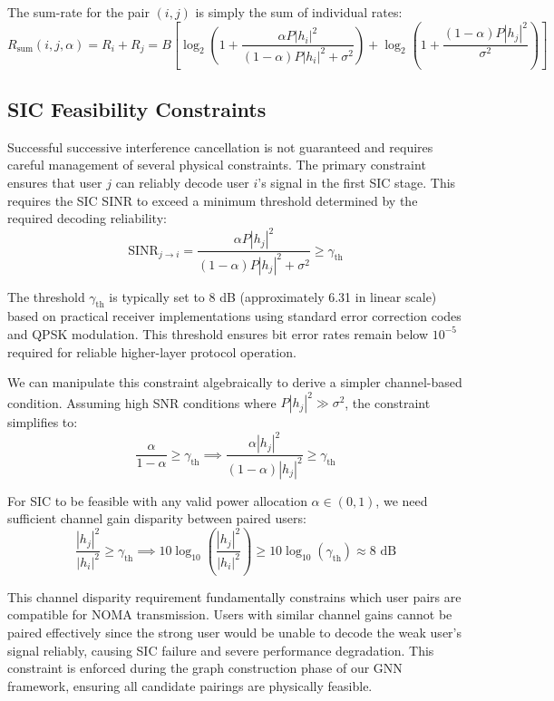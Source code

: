 The sum-rate for the pair $(i,j)$ is simply the sum of individual rates:
\begin{equation}
R_{\text{sum}}(i, j, \alpha) = R_i + R_j = B \left[ \log_2\left(1 + \frac{\alpha P |h_i|^2}{(1-\alpha) P |h_i|^2 + \sigma^2}\right) + \log_2\left(1 + \frac{(1-\alpha) P |h_j|^2}{\sigma^2}\right) \right]
\end{equation}

\subsection{SIC Feasibility Constraints}

Successful successive interference cancellation is not guaranteed and requires careful management of several physical constraints. The primary constraint ensures that user $j$ can reliably decode user $i$'s signal in the first SIC stage. This requires the SIC SINR to exceed a minimum threshold determined by the required decoding reliability:
\begin{equation}
\text{SINR}_{j \to i} = \frac{\alpha P |h_j|^2}{(1-\alpha) P |h_j|^2 + \sigma^2} \geq \gamma_{\text{th}}
\end{equation}

The threshold $\gamma_{\text{th}}$ is typically set to 8 dB (approximately 6.31 in linear scale) based on practical receiver implementations using standard error correction codes and QPSK modulation. This threshold ensures bit error rates remain below $10^{-5}$ required for reliable higher-layer protocol operation.

We can manipulate this constraint algebraically to derive a simpler channel-based condition. Assuming high SNR conditions where $P |h_j|^2 \gg \sigma^2$, the constraint simplifies to:
\begin{equation}
\frac{\alpha}{1-\alpha} \geq \gamma_{\text{th}} \implies \frac{\alpha |h_j|^2}{(1-\alpha) |h_j|^2} \geq \gamma_{\text{th}}
\end{equation}

For SIC to be feasible with any valid power allocation $\alpha \in (0,1)$, we need sufficient channel gain disparity between paired users:
\begin{equation}
\frac{|h_j|^2}{|h_i|^2} \geq \gamma_{\text{th}} \implies 10\log_{10}\left(\frac{|h_j|^2}{|h_i|^2}\right) \geq 10\log_{10}(\gamma_{\text{th}}) \approx 8 \text{ dB}
\end{equation}

This channel disparity requirement fundamentally constrains which user pairs are compatible for NOMA transmission. Users with similar channel gains cannot be paired effectively since the strong user would be unable to decode the weak user's signal reliably, causing SIC failure and severe performance degradation. This constraint is enforced during the graph construction phase of our GNN framework, ensuring all candidate pairings are physically feasible.

